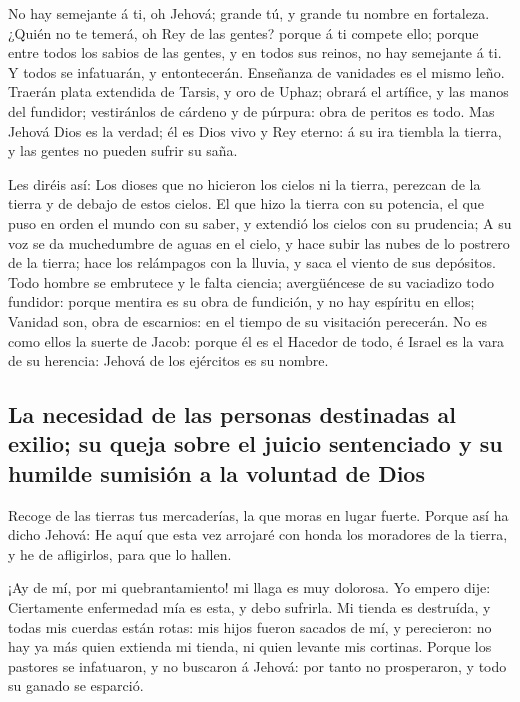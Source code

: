  No hay semejante á ti, oh Jehová; grande tú, y grande tu
nombre en fortaleza.  ¿Quién no te temerá, oh Rey de las
gentes? porque á ti compete ello; porque entre todos los sabios de las
gentes, y en todos sus reinos, no hay semejante á ti.  Y
todos se infatuarán, y entontecerán. Enseñanza de vanidades es el mismo
leño.  Traerán plata extendida de Tarsis, y oro de Uphaz;
obrará el artífice, y las manos del fundidor; vestiránlos de cárdeno y
de púrpura: obra de peritos es todo.  Mas Jehová Dios es la
verdad; él es Dios vivo y Rey eterno: á su ira tiembla la tierra, y las
gentes no pueden sufrir su saña.

 Les diréis así: Los dioses que no hicieron los cielos ni
la tierra, perezcan de la tierra y de debajo de estos cielos.
 El que hizo la tierra con su potencia, el que puso en
orden el mundo con su saber, y extendió los cielos con su prudencia;
 A su voz se da muchedumbre de aguas en el cielo, y hace
subir las nubes de lo postrero de la tierra; hace los relámpagos con la
lluvia, y saca el viento de sus depósitos.  Todo hombre se
embrutece y le falta ciencia; avergüéncese de su vaciadizo todo
fundidor: porque mentira es su obra de fundición, y no hay espíritu en
ellos;  Vanidad son, obra de escarnios: en el tiempo de su
visitación perecerán.  No es como ellos la suerte de Jacob:
porque él es el Hacedor de todo, é Israel es la vara de su herencia:
Jehová de los ejércitos es su nombre.

\hypertarget{la-necesidad-de-las-personas-destinadas-al-exilio-su-queja-sobre-el-juicio-sentenciado-y-su-humilde-sumisiuxf3n-a-la-voluntad-de-dios}{%
\subsection{La necesidad de las personas destinadas al exilio; su queja
sobre el juicio sentenciado y su humilde sumisión a la voluntad de
Dios}\label{la-necesidad-de-las-personas-destinadas-al-exilio-su-queja-sobre-el-juicio-sentenciado-y-su-humilde-sumisiuxf3n-a-la-voluntad-de-dios}}

 Recoge de las tierras tus mercaderías, la que moras en
lugar fuerte.  Porque así ha dicho Jehová: He aquí que esta
vez arrojaré con honda los moradores de la tierra, y he de afligirlos,
para que lo hallen.

 ¡Ay de mí, por mi quebrantamiento! mi llaga es muy
dolorosa. Yo empero dije: Ciertamente enfermedad mía es esta, y debo
sufrirla.  Mi tienda es destruída, y todas mis cuerdas
están rotas: mis hijos fueron sacados de mí, y perecieron: no hay ya más
quien extienda mi tienda, ni quien levante mis cortinas. 
Porque los pastores se infatuaron, y no buscaron á Jehová: por tanto no
prosperaron, y todo su ganado se esparció.

